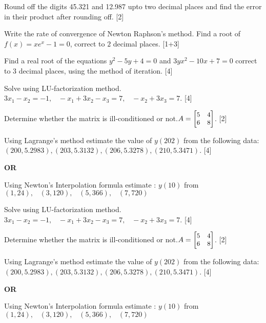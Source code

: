 \documentclass[12pt]{exam}
\begin{document}
\begin{questions}

\question Round off the digits 45.321 and 12.987 upto two decimal places and find the error in their product after rounding off. [2]

\question Write the rate of convergence of Newton Raphson's method. Find a root of \(f(x)=xe^x-1=0\), correct to \(2\) decimal places. [1+3]

\question Find a real root of the equations $y^2-5y+4=0$ and $3yx^2-10x+7=0$ correct to 3 decimal places, using the method of iteration. [4]

\end{questions}

  \clearpage

  \vspace{4cm}

  \begin{questions}
      \setcounter{question}{3}
\question Solve using LU-factorization method. $3x_1 - x_2 = -1, \;\;\; -x_1+3x_2-x_3 = 7, \;\;\; -x_2+3x_3 =7$. [4]

\question Determine whether the matrix is ill-conditioned or not.$\small A=   \begin{bmatrix}
    5  & 4 \\
    6 & 8 \\
  \end{bmatrix}$. [2]

\question Using Lagrange's method estimate the value of $y(202)$ from the following data: \\[2mm]
  $(200, 5.2983), (203,5.3132), (206,5.3278), (210,5.3471)$. [4]

 \begin{center}
    \bfseries OR
  \end{center}
  Using Newton's Interpolation formula estimate : $y(10)$ from \\
  $(1,24), \;\;\; (3,120),\;\;\; (5,366), \;\;\; (7,720)$

  \vspace{9cm}
  \setcounter{question}{3}
 \question Solve using LU-factorization method. $3x_1 - x_2 = -1, \;\;\; -x_1+3x_2-x_3 = 7, \;\;\; -x_2+3x_3 =7$. [4]

\question Determine whether the matrix is ill-conditioned or not.$\small A=   \begin{bmatrix}
    5  & 4 \\
    6 & 8 \\
  \end{bmatrix}$. [2]

\question Using Lagrange's method estimate the value of $y(202)$ from the following data: \\[1mm]
  $(200, 5.2983), (203,5.3132), (206,5.3278), (210,5.3471)$. [4]
  \begin{center}
    \bfseries OR
  \end{center}
  Using Newton's Interpolation formula estimate : $y(10)$ from \\
  $(1,24), \;\;\; (3,120),\;\;\; (5,366), \;\;\; (7,720)$


\end{questions}
\end{document}

